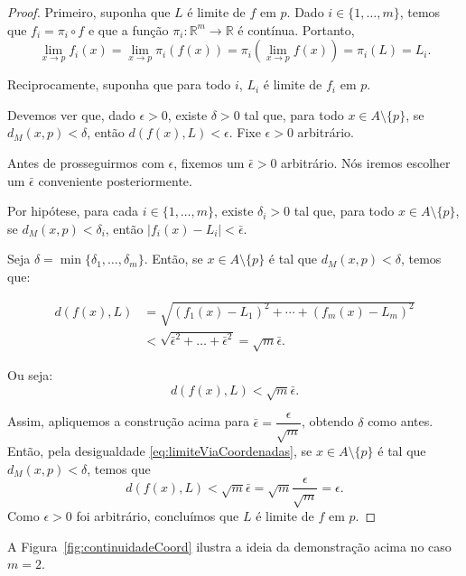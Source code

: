 \begin{proof}
Primeiro, suponha que $L$ é limite de $f$ em $p$.
Dado $i \in \{1, \dots, m\}$, temos que $f_i=\pi_i\circ f$ e que a função $\pi_i: \mathbb R^m\to \mathbb R$ é contínua. Portanto,
\[
    \lim_{x\to p} f_i(x)
    =
    \lim_{x\to p} \pi_i(f(x))
    =
    \pi_i\left(\lim_{x\to p} f(x)\right)
    =
    \pi_i(L)
    =
    L_i.
\]

    Reciprocamente, suponha que para todo $i$, $L_i$ é limite de $f_i$ em $p$.

    Devemos ver que, dado $\epsilon>0$, existe $\delta>0$ tal que, para todo $x \in A\setminus\{p\}$, se $d_M(x, p) < \delta$, então $d(f(x), L) < \epsilon$.
    Fixe $\epsilon>0$ arbitrário.

    Antes de prosseguirmos com $\epsilon$, fixemos um $\bar \epsilon>0$ arbitrário.
    Nós iremos escolher um $\bar \epsilon$ conveniente posteriormente.

    Por hipótese, para cada $i\in \{1, \dots, m\}$, existe $\delta_i>0$ tal que, para todo $x\in A\setminus\{p\}$, se $d_M(x, p) < \delta_i$, então $|f_i(x) - L_i| < \bar \epsilon$.

    Seja $\delta = \min\{\delta_1, \ldots, \delta_m\}$. Então, se $x \in A\setminus\{p\}$ é tal que $d_M(x, p) < \delta$, temos que:

    \begin{align*}
        d(f(x), L) &= \sqrt{(f_1(x) - L_1)^2 + \cdots + (f_m(x) - L_m)^2} \\
        &< \sqrt{\bar \epsilon^2+\dots+\bar \epsilon^2}= \sqrt{m}\bar \epsilon.
    \end{align*}

    Ou seja:
    \begin{equation}\label{eq:limiteViaCoordenadas}
        d(f(x), L) < \sqrt{m}\bar \epsilon.
    \end{equation}

    Assim, apliquemos a construção acima para $\bar \epsilon = \dfrac{\epsilon}{\sqrt{m}}$, obtendo $\delta$ como antes.
    Então, pela desigualdade \eqref{eq:limiteViaCoordenadas}, se $x \in A\setminus\{p\}$ é tal que $d_M(x, p) < \delta$, temos que
    \[
        d(f(x), L) < \sqrt{m}\bar \epsilon = \sqrt{m}\frac{\epsilon}{\sqrt{m}} = \epsilon.
    \]
    Como $\epsilon>0$ foi arbitrário, concluímos que $L$ é limite de $f$ em $p$.
\end{proof}

A Figura~\ref{fig:continuidadeCoord} ilustra a ideia da demonstração acima no caso $m=2$.

